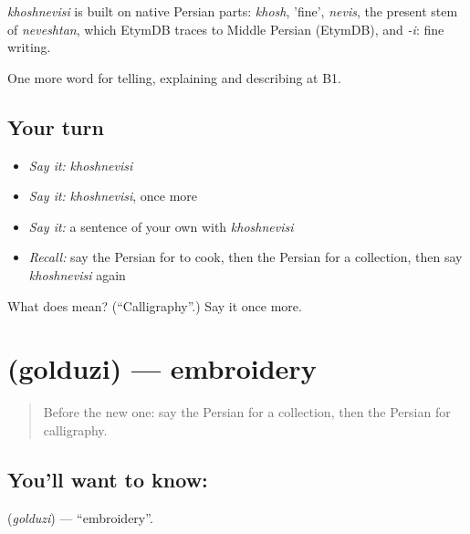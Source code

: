 \begin{cousinweb}
\emph{khoshnevisi} is built on native Persian parts: \emph{khosh}, 'fine', \emph{nevis}, the present stem of \emph{neveshtan}, which EtymDB traces to Middle Persian (EtymDB), and \emph{-i}: fine writing.
\end{cousinweb}

\begin{grammarlens}[title={What you've built}]
One more word for telling, explaining and describing at B1.
\end{grammarlens}

\subsection*{Your turn}
\begin{itemize}
\raggedright
  \item \emph{Say it:} \emph{khoshnevisi}
  \item \emph{Say it:} \emph{khoshnevisi}, once more
  \item \emph{Say it:} a sentence of your own with \emph{khoshnevisi}
  \item \emph{Recall:} say the Persian for to cook, then the Persian for a collection, then say \emph{khoshnevisi} again
\end{itemize}

\begin{tcolorbox}[breakable,colback=teal!4,colframe=teal!35!black,title={Before you move on}]
What does  mean? (\textquotedblleft{}Calligraphy\textquotedblright{}.) Say it once more.
\end{tcolorbox}
\section[\texorpdfstring{\fa{گلدوزی} (golduzi)}{گلدوزی (golduzi)}]{ (golduzi) — embroidery}

\label{lesson:FA-C508-golduzi}



\begin{quote}
Before the new one: say the Persian for a collection, then the Persian for calligraphy.
\end{quote}

\subsection*{You'll want to know: }
\textbf{} (\emph{golduzi}) — \textquotedblleft{}embroidery\textquotedblright{}.

